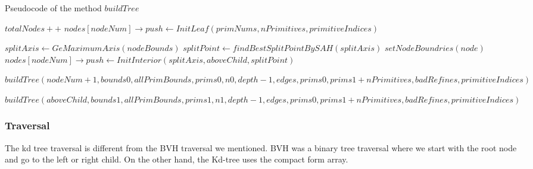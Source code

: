 \documentclass[11pt,a4paper]{article}
\begin{document}
\begin{algorithm}[H]
\caption{Pseudocode of the method $buildTree$}\label{alg:alg1}
\begin{algorithmic}
\State $totalNodes++$
	\State $nodes[nodeNum] \rightarrow push \gets InitLeaf(primNums, nPrimitives, primitiveIndices)$
	\State \Return
\EndIf

\State $splitAxis \gets GeMaximumAxis(nodeBounds)$
\State $splitPoint \gets findBestSplitPointBySAH(splitAxis)$
\State $setNodeBoundries(node)$
\State $nodes[nodeNum] \rightarrow push \gets InitInterior(splitAxis, aboveChild, splitPoint)$

\State $buildTree(nodeNum+1, bounds0, allPrimBounds, prims0, n0, depth - 1, edges, prims0, prims1 + nPrimitives, badRefines, primitiveIndices)$

\State $buildTree(aboveChild, bounds1, allPrimBounds, prims1, n1, depth - 1, edges, prims0, prims1 + nPrimitives, badRefines, primitiveIndices)$

\EndFunction
\end{algorithmic}
\end{algorithm}

\subsubsection{Traversal}
The kd tree traversal is different from the BVH traversal we mentioned. BVH was a binary tree traversal where we start with the root node and go to the left or right child. On the other hand, the Kd-tree uses the compact form array. 
\end{document}
